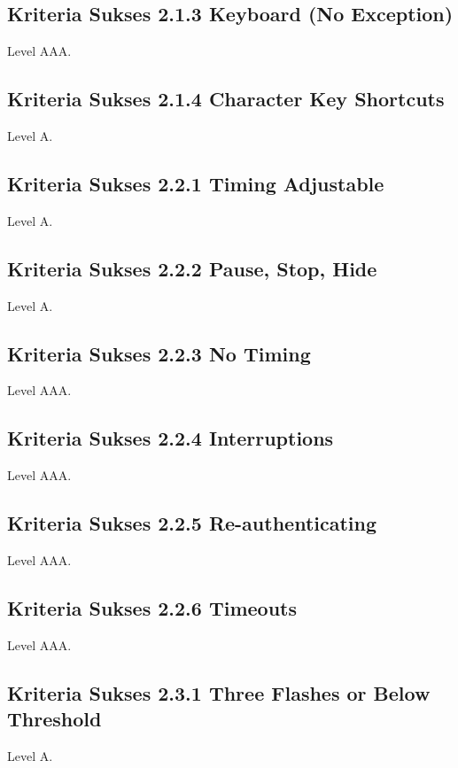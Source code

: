 \subsection{Kriteria Sukses 2.1.3 Keyboard (No Exception)}
\label{sec:kriteria_2.1.3}
Level AAA.

\subsection{Kriteria Sukses 2.1.4 Character Key Shortcuts}
\label{sec:kriteria_2.1.4}
Level A.

\subsection{Kriteria Sukses 2.2.1 Timing Adjustable}
\label{sec:kriteria_2.2.1}
Level A.

\subsection{Kriteria Sukses 2.2.2 Pause, Stop, Hide}
\label{sec:kriteria_2.2.2}
Level A.

\subsection{Kriteria Sukses 2.2.3 No Timing}
\label{sec:kriteria_2.2.3}
Level AAA.

\subsection{Kriteria Sukses 2.2.4 Interruptions}
\label{sec:kriteria_2.2.4}
Level AAA.

\subsection{Kriteria Sukses 2.2.5 Re-authenticating}
\label{sec:kriteria_2.2.5}
Level AAA.

\subsection{Kriteria Sukses 2.2.6 Timeouts}
\label{sec:kriteria_2.2.6}
Level AAA.

\subsection{Kriteria Sukses 2.3.1 Three Flashes or Below Threshold}
\label{sec:kriteria_2.3.1}
Level A.

